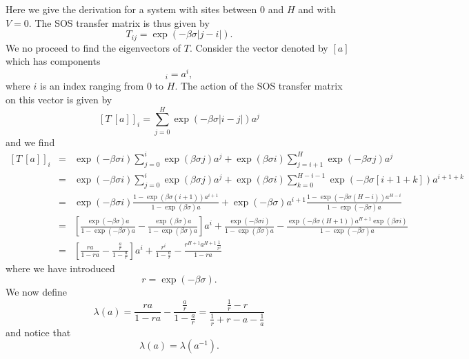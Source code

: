 Here we give the derivation for a system with sites between $0$ and $H$ and with $V=0$.  The SOS transfer matrix is thus given by 
\begin{equation}
    T_{ij} = \exp(-\beta\sigma|j-i|).
\end{equation}
We no proceed to find the eigenvectors of $T$.  Consider the vector denoted by $[a]$ which has components
\begin{equation}
[a]_i = a^i,
\end{equation}
where $i$ is an index ranging from $0$ to $H$. 
The action of the SOS transfer matrix on this vector is given by
\begin{equation}
    \left[T\ [a]\right]_i = \sum_{j=0}^H\exp(-\beta\sigma |i-j|)a^j
\end{equation}
and we find
\begin{eqnarray}
\left[T\ [a]\right]_i&=& \exp(-\beta\sigma i)\sum_{j=0}^i\exp(\beta\sigma j)a^j + \exp(\beta\sigma i)
\sum_{j= i+1}^H \exp(-\beta\sigma j)a^j\nonumber \\
&=&\exp(-\beta\sigma i)\sum_{j=0}^i\exp(\beta\sigma j)a^j + \exp(\beta\sigma i) \sum_{k= 0}^{H-i-1} \exp(-\beta\sigma [i+1+k])a^{i+1+k} \nonumber \\
&=& \exp(-\beta\sigma i)\frac{1-\exp(\beta\sigma (i+1))a^{i+1}}{1-\exp(\beta\sigma)a}
+ \exp(-\beta\sigma)a^{i+1}\frac{1- \exp(-\beta\sigma(H-i))a^{H-i}}{1-\exp(-\beta\sigma)a}\nonumber \\
&=& \left[\frac{\exp(-\beta\sigma) a}{1-\exp(-\beta\sigma)a}- \frac{\exp(\beta\sigma) a}{1-\exp(\beta\sigma)a}\right]a^i +\frac{\exp(-\beta\sigma i)}{1-\exp(\beta\sigma)a}-\frac{\exp(-\beta\sigma(H+1))a^{H+1}\exp(\beta\sigma i)}{1-\exp(-\beta\sigma)a}\nonumber\\
&=&\left[\frac{ ra}{1-ra}- \frac{ \frac{a}{r}}{1-\frac{a}{r}}\right]a^i +\frac{r^i}{1-\frac{a}{r}}-\frac{r^{H+1}a^{H+1}\frac{1}{r^i}}{1-ra}\nonumber
\end{eqnarray}
where we have introduced
\begin{equation}
    r=\exp(-\beta\sigma).
\end{equation}
We now define
\begin{equation}
    \lambda(a)= \frac{ ra}{1-ra}- \frac{ \frac{a}{r}}{1-\frac{a}{r}} = \frac{\frac{1}{r}-r}{\frac{1}{r}+r
- a-\frac{1}{a}}\label{elam}
\end{equation}
and notice that
\begin{equation}
    \lambda(a) = \lambda(a^{-1}).
\end{equation}

